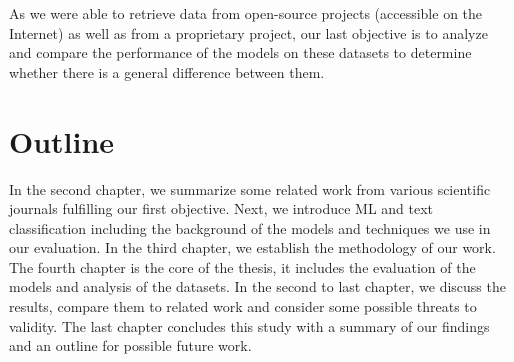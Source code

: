 As we were able to retrieve data from open-source projects (accessible on the Internet) as well as from a proprietary project, our last objective is to analyze and compare the performance of the models on these datasets to determine whether there is a general difference between them.


\section{Outline}

In the second chapter, we summarize some related work from various scientific journals fulfilling our first objective. Next, we introduce ML and text classification including the background of the models and techniques we use in our evaluation. In the third chapter, we establish the methodology of our work. The fourth chapter is the core of the thesis, it includes the evaluation of the models and analysis of the datasets. In the second to last chapter, we discuss the results, compare them to related work and consider some possible threats to validity. The last chapter concludes this study with a summary of our findings and an outline for possible future work.
